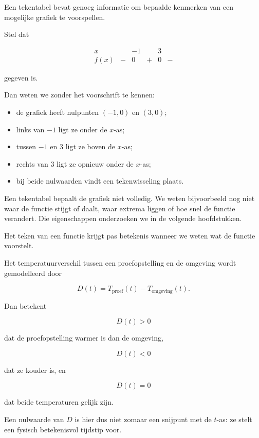 \documentclass{ximera}
\begin{document}

Een tekentabel bevat genoeg informatie om bepaalde kenmerken van
een mogelijke grafiek te voorspellen.

Stel dat

\[
\begin{array}{c|ccccc}
x &  & -1 &  & 3 & \\
\hline
f(x) & - & 0 & + & 0 & -
\end{array}
\]

gegeven is.

Dan weten we zonder het voorschrift te kennen:

\begin{itemize}
    \item de grafiek heeft nulpunten \((-1,0)\) en \((3,0)\);
    \item links van \(-1\) ligt ze onder de \(x\)-as;
    \item tussen \(-1\) en \(3\) ligt ze boven de \(x\)-as;
    \item rechts van \(3\) ligt ze opnieuw onder de \(x\)-as;
    \item bij beide nulwaarden vindt een tekenwisseling plaats.
\end{itemize}

\begin{opmerking}
Een tekentabel bepaalt de grafiek niet volledig.
We weten bijvoorbeeld nog niet waar de functie stijgt of daalt,
waar extrema liggen of hoe snel de functie verandert.
Die eigenschappen onderzoeken we in de volgende hoofdstukken.
\end{opmerking}




Het teken van een functie krijgt pas betekenis wanneer we weten
wat de functie voorstelt.

\begin{voorbeeld}[Temperatuurverschil]

Het temperatuurverschil tussen een proefopstelling en de omgeving
wordt gemodelleerd door

\[
D(t)=T_{\text{proef}}(t)-T_{\text{omgeving}}(t).
\]

Dan betekent

\[
D(t)>0
\]

dat de proefopstelling warmer is dan de omgeving,

\[
D(t)<0
\]

dat ze kouder is, en

\[
D(t)=0
\]

dat beide temperaturen gelijk zijn.

Een nulwaarde van \(D\) is hier dus niet zomaar een snijpunt met
de \(t\)-as: ze stelt een fysisch betekenisvol tijdstip voor.
\end{voorbeeld}
\end{document}
